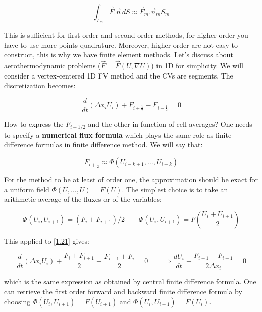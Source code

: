 \begin{equation}
\int _{\Gamma _m} \vec{F}.\vec{n} \, dS \approx \vec{F}_m .\vec{n}_m S_m
\end{equation}

This is sufficient for first order and second order methods, for higher order you have to use more points quadrature. Moreover, higher order are not easy to construct, this is why we have finite element methods. Let's discuss about aerothermodynamic problems ($\vec{F} = \vec{F} (U, \nabla U)$) in 1D for simplicity. We will consider a vertex-centered 1D FV method and the CVs are segments. The discretization becomes: 

\begin{equation}
\frac{d}{dt} (\Delta x_i U_i) + F_{i+\frac{1}{2}} - F_{i-\frac{1}{2}} = 0
\label{1.21}
\end{equation}

How to express the $F_{i+1/2}$ and the other in function of cell averages? One needs to specify a \textbf{numerical flux formula} which plays the same role as finite difference formulas in finite difference method. We will say that: 

\begin{equation}
F_{i+\frac{1}{2}} \approx \Phi (U_{i-k+1}, \dots , U_{i+k})
\end{equation}

For the method to be at least of order one, the approximation should be exact for a uniform field $\Phi (U,\dots , U) = F(U)$. The simplest choice is to take an arithmetic average of the fluxes or of the variables: 

\begin{equation}
\Phi (U_i, U_{i+1}) = (F_i + F_{i+1})/2 \qquad \Phi (U_i , U_{i+1}) = F\left(\frac{U_i + U_{i+1}}{2}\right)
\end{equation}

This applied to \autoref{1.21} gives: 

\begin{equation}
\frac{d}{dt}(\Delta x_i U_i) + \frac{F_{i} + F_{i+1}}{2} - \frac{F_{i-1} + F_i}{2} = 0 \qquad \Rightarrow \frac{dU_i}{dt} + \frac{F_{i+1} - F_{i-1}}{2\Delta x_i} = 0
\end{equation}

which is the same expression as obtained by central finite difference formula. One can retrieve the first order forward and backward finite difference formula by choosing $\Phi (U_i,U_{i+1}) = F(U_{i+1})$ and $\Phi (U_i,U_{i+1}) = F(U_i)$. \\

